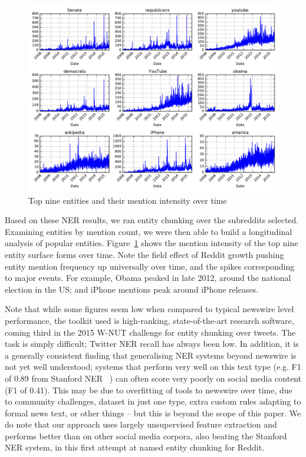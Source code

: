 \documentclass[review]{elsarticle}
\begin{document}
\begin{figure}
\begin{center}
\includegraphics[width=0.79\columnwidth]{plots/entity_ts.pdf}
\caption{Top nine entities and their mention intensity over time}
\end{center}
\label{fig:entity-ts}
\end{figure}

Based on these NER results, we ran entity chunking over the subreddits selected.
Examining entities by mention count, we were then able to build a longitudinal analysis of popular entities.
Figure~\ref{fig:entity-ts} shows the mention intensity of the top nine entity surface forms over time.
Note the field effect of Reddit growth pushing entity mention frequency up universally over time, and the spikes corresponding to major events.
For example, Obama peaked in late 2012, around the national election in the US; and iPhone mentions peak around iPhone releases.

Note that while some figures seem low when compared to typical newswire level performance, the toolkit used is high-ranking, state-of-the-art research software, coming third in the 2015 W-NUT challenge for entity chunking over tweets.
The task is simply difficult; Twitter NER recall has always been low.
In addition, it is a generally consistent finding that generalising NER systems beyond newswire is not yet well understood; systems that perform very well on this text type (e.g. F1 of 0.89 from Stanford NER~\cite{derczynski2015analysis}%
) can often score very poorly on social media content (F1 of 0.41).
This may be due to overfitting of tools to newswire over time, due to community challenges, dataset in just one type, extra custom rules adapting to formal news text, or other things -- but this is beyond the scope of this paper.
We do note that our approach uses largely unsupervised feature extraction and performs better than on other social media corpora, also beating the Stanford NER system, in this first attempt at named entity chunking for Reddit.
\end{document}
